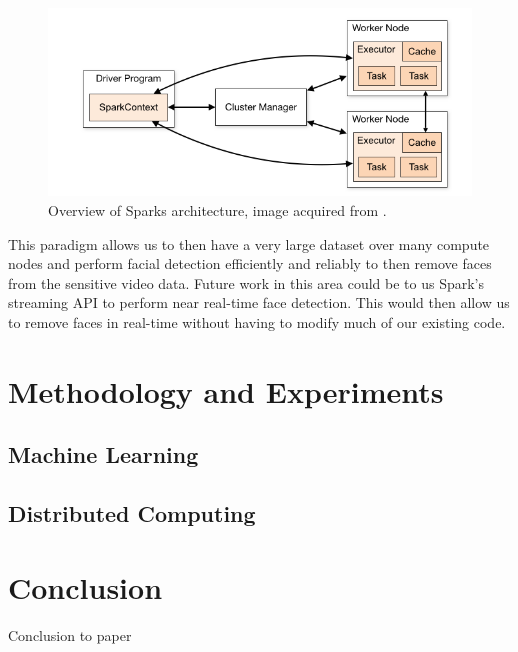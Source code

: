 \documentclass[
	submission,
	final,
	notitlepage,
	narroweqnarray,
	inline,
	twoside,
	]{ieee}
\begin{document}
\begin{figure}[h]
\centering
\includegraphics[width=\linewidth]{figures/spark_model}
\caption{Overview of Sparks architecture, image acquired from \cite{spark}.}
\label{fig:spark_model} 
\end{figure}
\FloatBarrier

This paradigm allows us to then have a very large dataset over many compute
nodes and perform facial detection efficiently and reliably to then 
remove faces from the sensitive video data. Future work in this area
could be to us Spark's streaming API to perform near real-time face detection. 
This would then allow us to remove faces in real-time without having to 
modify much of our existing code. 

\section{Methodology and Experiments} 
\subsection{Machine Learning} 
\subsection{Distributed Computing}

\section{Conclusion}
\PARstart Conclusion to paper



\end{document}
